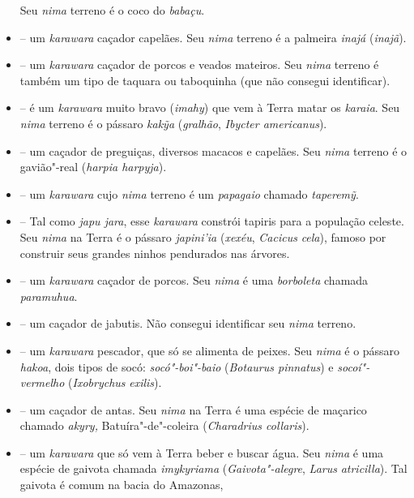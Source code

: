 \begin{itemize}
  Seu \emph{nima} terreno é o coco do \emph{babaçu}.
\item
   -- um \emph{karawara} caçador
  capelães. Seu \emph{nima} terreno é a palmeira \emph{inajá}
  (\emph{inajã}).
\item
  \emph{} -- um \emph{karawara} caçador de porcos e
  veados mateiros. Seu \emph{nima} terreno é também um tipo de taquara
  ou taboquinha (que não consegui identificar).
\item
  \emph{} -- é um \emph{karawara} muito bravo
  (\emph{imahy}) que vem à Terra matar os \emph{karaia}. Seu \emph{nima}
  terreno é o pássaro \emph{kakỹa} (\emph{gralhão}, \emph{Ibycter
  americanus}).
\item
  \emph{} -- um caçador de preguiças,
  diversos macacos e capelães. Seu \emph{nima} terreno é o gavião"-real
  (\emph{harpia harpyja}).
\item
  \emph{} -- um \emph{karawara} cujo \emph{nima}
  terreno é um \emph{papagaio} chamado \emph{taperemỹ}.
\item
  \emph{} -- Tal como \emph{japu jara}, esse
  \emph{karawara} constrói tapiris para a população celeste. Seu
  \emph{nima} na Terra é o pássaro \emph{japini'ia} (\emph{xexéu},
  \emph{Cacicus} \emph{cela}), famoso por construir seus grandes ninhos
  pendurados nas árvores.
\item
  \emph{} -- um \emph{karawara} caçador de porcos. Seu
  \emph{nima} é uma \emph{borboleta} chamada \emph{paramuhua}.
\item
  \emph{} -- um caçador de jabutis. Não consegui
  identificar seu \emph{nima} terreno.
\item
   -- um \emph{karawara} pescador, que só se
  alimenta de peixes. Seu \emph{nima} é o pássaro \emph{hakoa}, dois
  tipos de socó: \emph{socó"-boi"-baio} (\emph{Botaurus pinnatus}) e
  \emph{socoí"-vermelho} (\emph{Ixobrychus} \emph{exilis}).
\item
   -- um caçador de antas. Seu \emph{nima} na
  Terra é uma espécie de maçarico chamado \emph{akyry,}
  Batuíra"-de"-coleira (\emph{Charadrius collaris}).
\item
  \emph{} -- um \emph{karawara} que só vem à
  Terra beber e buscar água. Seu \emph{nima} é uma espécie de gaivota
  chamada \emph{imykyriama} (\emph{Gaivota"-alegre}, \emph{Larus}
  \emph{atricilla}). Tal gaivota é comum na bacia do Amazonas,

\end{itemize}
